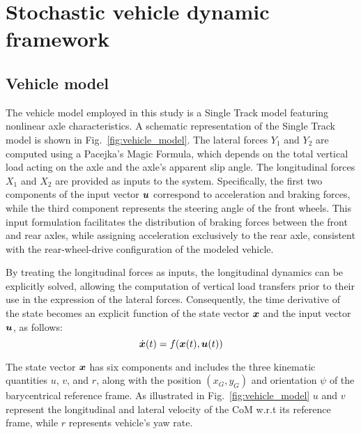 \section{Stochastic vehicle dynamic framework}
\label{sec:svdf}

\subsection{Vehicle model}
\label{sec:vehicle_model}
The vehicle model employed in this study is a Single Track model featuring nonlinear axle characteristics. A schematic representation of the Single Track model is shown in Fig.~\ref{fig:vehicle_model}. The lateral forces $Y_1$ and $Y_2$ are computed using a Pacejka's Magic Formula, which depends on the total vertical load acting on the axle and the axle's apparent slip angle.
The longitudinal forces $X_1$ and $X_2$ are provided as inputs to the system. Specifically, the first two components of the input vector $\boldsymbol{u}$ correspond to acceleration and braking forces, while the third component represents the steering angle of the front wheels. This input formulation facilitates the distribution of braking forces between the front and rear axles, while assigning acceleration exclusively to the rear axle, consistent with the rear-wheel-drive configuration of the modeled vehicle.

By treating the longitudinal forces as inputs, the longitudinal dynamics can be explicitly solved, allowing the computation of vertical load transfers prior to their use in the expression of the lateral forces. Consequently, the time derivative of the state becomes an explicit function of the state vector $\boldsymbol{x}$ and the input vector $\boldsymbol{u}$, as follows:
\begin{equation}
	\dot{\boldsymbol{x}}(t) = f(\boldsymbol{x}(t), \boldsymbol{u}(t))
\end{equation}

The state vector $\boldsymbol{x}$ has six components and includes the three kinematic quantities $u$, $v$, and $r$, along with the position $\left(x_G, y_G\right)$ and orientation $\psi$ of the barycentrical reference frame. As illustrated in Fig.~\ref{fig:vehicle_model} $u$ and $v$ represent the longitudinal and lateral velocity of the CoM w.r.t its reference frame, while $r$ represents vehicle's yaw rate.

